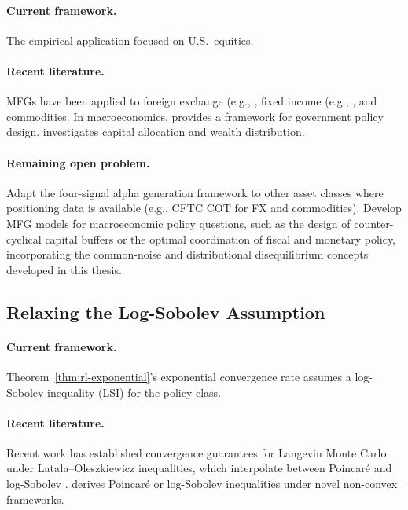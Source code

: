 \paragraph{Current framework.} The empirical application focused on U.S.\
equities.

\paragraph{Recent literature.} MFGs have been applied to foreign exchange (e.g.,
\citep{jaimungalnourian2015}, fixed income (e.g., \citep{carmonawang2021}, and
commodities. In macroeconomics, \citep{macromfg2025} provides a framework for government policy
design. \citep{heteromacrofinance2025}
investigates capital allocation and wealth distribution.

\paragraph{Remaining open problem.} Adapt the four-signal alpha generation
framework to other asset classes where positioning data is available (e.g., CFTC
COT for FX and commodities). Develop MFG models for macroeconomic policy
questions, such as the design of counter-cyclical capital buffers or the optimal
coordination of fiscal and monetary policy, incorporating the common-noise and
distributional disequilibrium concepts developed in this thesis.

\subsection{Relaxing the Log-Sobolev Assumption}

\paragraph{Current framework.} Theorem~\ref{thm:rl-exponential}'s exponential
convergence rate assumes a log-Sobolev inequality (LSI) for the policy class.

\paragraph{Recent literature.} Recent work has established convergence
guarantees for Langevin Monte Carlo under Lata\l a--Oleszkiewicz inequalities,
which interpolate between Poincar\'e and log-Sobolev \citep{latalaoleszkiewicz2022}. \citep{tamingisoperimetry2025} derives Poincar\'e or log-Sobolev inequalities under novel
non-convex frameworks.

